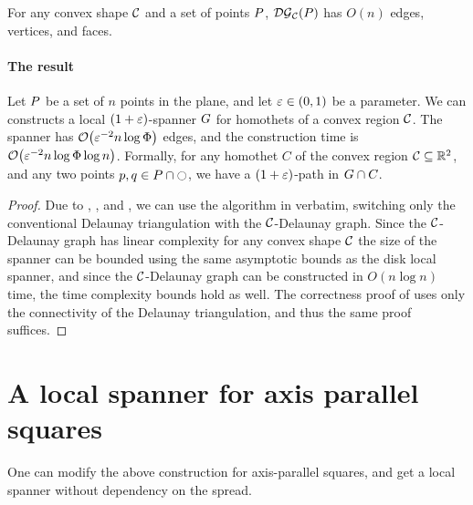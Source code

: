 \documentclass[12pt]{article}%
\begin{document}
\begin{lemma}
    For any convex shape $\mathcal{C}$ and a set of points $P$,
    $\mathcal{DG}_{\mathcal{C}}(P)$ has $O(n)$ edges, vertices, and faces.
\end{lemma}


\paragraph{The result}
\begin{theorem}
    Let $P$ be a set of $n$ points in the plane, and let
    $\varepsilon \in (0,1)$ be a parameter. We can constructs a local
    $(1+\varepsilon)$-spanner $G$ for homothets of a convex region
    $\mathcal{C}$. The spanner has $\Of\pth{ \eps^{-2} n\log \spread }$ edges,
    and the construction time is
    $\Of\pth{ \eps^{-2} n\log \spread \log n }$.  Formally, for any
    homothet $C$ of the convex region $\mathcal{C}\subseteq \mathbb{R}^2$, and any
    two points $p, q \in P \cap \ocircle$, we have a
    $(1+\varepsilon)$-path in $G \cap {C}$.
\end{theorem}

\begin{proof}
    Due to ,
    , and , we can use
    the algorithm in  verbatim, switching
    only the conventional Delaunay triangulation with the
    $\mathcal{C}$-Delaunay graph. Since the $\mathcal{C}$-Delaunay graph has linear
    complexity for any convex shape $\mathcal{C}$ the size of the spanner can
    be bounded using the same asymptotic bounds as the disk local
    spanner, and since the $\mathcal{C}$-Delaunay graph can be constructed in
    $O(n\log n)$ time, the time complexity bounds hold as well. The
    correctness proof of  uses only the connectivity of
    the Delaunay triangulation, and thus the same proof suffices.


\end{proof}






\section{A local spanner for axis parallel squares}
 One can modify the above construction for
axis-parallel squares, and get a local spanner without dependency on
the spread.
\end{document}
